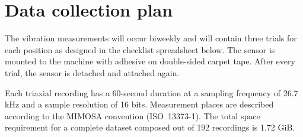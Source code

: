 \thispagestyle{empty}
\chapter{Data collection plan} \label{appendix:data-collection}
\renewcommand*{\thepage}{C-\arabic{page}}

The vibration measurements will occur biweekly and will contain three trials for each position as designed in the checklist spreadsheet below. The sensor is mounted to the machine with adhesive on double-sided carpet tape. After every trial, the sensor is detached and attached again. 

Each triaxial recording has a 60-second duration at a sampling frequency of 26.7 kHz and a sample resolution of 16 bits. Measurement places are described according to the MIMOSA convention (ISO~13373-1). The total space requirement for a complete dataset composed out of 192 recordings is 1.72 GiB.

